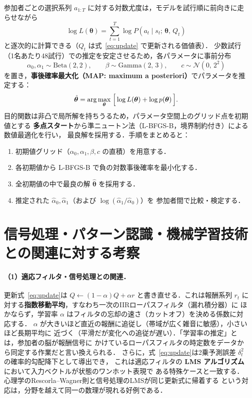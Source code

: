 \documentclass[a4paper,11pt]{jsarticle}
\begin{document}
参加者ごとの選択系列 $a_{1:T}$ に対する対数尤度は，モデルを試行順に前向きに走らせながら
\begin{equation}
  \log L(\bm{\theta})
  = \sum_{t=1}^{T} \log P(a_t \mid s_t;\, \bm{\theta},\, Q_t)
\end{equation}
と逐次的に計算できる（$Q_t$ は式~\eqref{eq:update} で更新される価値表）．
少数試行（1名あたり48試行）での推定を安定させるため，各パラメータに事前分布
\begin{equation}
  \alpha_0, \alpha_1 \sim \mathrm{Beta}(2,2), \qquad
  \beta \sim \mathrm{Gamma}(2,\,3), \qquad
  c \sim \mathcal{N}(0,\,2^2)
\end{equation}
を置き，\textbf{事後確率最大化（MAP: maximum a posteriori）}でパラメータを推定する：
\begin{equation}
  \hat{\bm{\theta}}
  = \arg\max_{\bm{\theta}}\;
    \Bigl[\, \log L(\bm{\theta}) + \log p(\bm{\theta}) \,\Bigr].
\end{equation}
目的関数は非凸で局所解を持ちうるため，パラメータ空間上のグリッド点を初期値とする
\textbf{多点スタート}から準ニュートン法（L-BFGS-B，境界制約付き）による数値最適化を行い，
最良解を採用する．手順をまとめると：
\begin{enumerate}
  \item 初期値グリッド（$\alpha_0, \alpha_1, \beta, c$ の直積）を用意する．
  \item 各初期値から L-BFGS-B で負の対数事後確率を最小化する．
  \item 全初期値の中で最良の解 $\hat{\bm{\theta}}$ を採用する．
  \item 推定された $\hat{\alpha}_0, \hat{\alpha}_1$（および $\log(\hat\alpha_1/\hat\alpha_0)$）を
        参加者間で比較・検定する．
\end{enumerate}

\section{信号処理・パターン認識・機械学習技術との関連に対する考察}

\paragraph{（1）適応フィルタ・信号処理との関連．}
更新式~\eqref{eq:update}は $Q \leftarrow (1-\alpha)Q + \alpha r$ と書き直せる．これは報酬系列
$r_t$ に対する\textbf{指数移動平均}，すなわち一次のIIRローパスフィルタ（漏れ積分器）に
ほかならず，学習率 $\alpha$ はフィルタの忘却の速さ（カットオフ）を決める係数に対応する．
$\alpha$ が大きいほど直近の報酬に追従し（帯域が広く雑音に敏感），小さいほど長期平均に
近づく（平滑だが変化への追従が遅い）．「学習率の推定」とは，参加者の脳が報酬信号に
かけているローパスフィルタの時定数をデータから同定する作業だと言い換えられる．
さらに，式~\eqref{eq:update}は2乗予測誤差 $\delta_t^2$ の確率的勾配降下として導出でき，
これは適応フィルタの \textbf{LMS アルゴリズム}において入力ベクトルが状態のワンホット表現で
ある特殊ケースと一致する．心理学のRescorla--Wagner則と信号処理のLMSが同じ更新式に帰着する
という対応は，分野を越えて同一の数理が現れる好例である．
\end{document}
